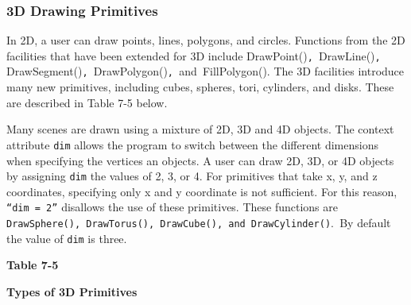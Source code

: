 \subsubsection{3D Drawing Primitives}

In 2D, a user can draw points, lines, polygons, and circles. Functions
from the 2D facilities that have been extended for 3D include
DrawPoint()\texttt{, }DrawLine()\texttt{, }DrawSegment()\texttt{,
}DrawPolygon()\texttt{, }and\texttt{ }FillPolygon(). The 3D facilities
introduce many new primitives, including cubes, spheres, tori,
cylinders, and disks. These are described in Table 7-5 below.

Many scenes are drawn using a mixture of 2D, 3D and 4D objects. The
context attribute \texttt{dim} allows the program to switch between the
different dimensions when specifying the vertices an objects. A user
can draw 2D, 3D, or 4D objects by assigning \texttt{dim} the values of
2, 3, or 4. For primitives that take x, y, and z coordinates,
specifying only x and y coordinate is not sufficient. For this reason,
\texttt{{\textquotedblleft}dim = 2{\textquotedblright}} disallows the
use of these primitives. These functions are
\texttt{DrawSphere()}\texttt{, }\texttt{DrawTorus()}\texttt{,
}\texttt{DrawCube()}\texttt{, and }\texttt{DrawCylinder()}.\texttt{ }By
default the value of \texttt{dim} is three.

\bigskip

{\centering\sffamily\bfseries
Table 7-5
\par}

{\centering\sffamily\bfseries
Types of 3D Primitives
\par}

